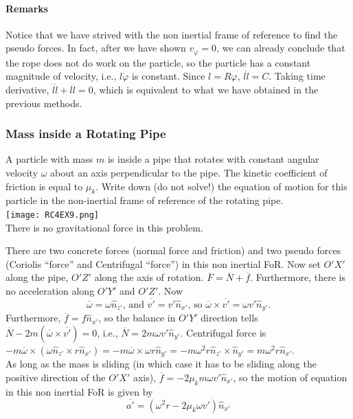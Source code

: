 \documentclass[a4paper,12pt,titlepage]{article}
\begin{document}
\paragraph{Remarks}
Notice that we have strived with the non inertial frame of reference to find the pseudo forces. In fact, after we have shown $v_{\varphi}=0$, we can already conclude that the rope does not do work on the particle, so the particle has a constant magnitude of velocity, i.e., $l\dot\varphi$ is constant. Since $l=R\varphi$, $l\dot l=C$. Taking time derivative, $\dot l \dot l+l\ddot l=0$, which is equivalent to what we have obtained in the previous methods.
\subsubsection{Mass inside a Rotating Pipe}
A particle with mass $m$ is inside a pipe that rotates with constant angular velocity $\omega$ about an axis perpendicular to the pipe. The kinetic coefficient of friction is equal to $\mu_k$. Write down (do not solve!) the equation of motion for this particle in the non-inertial frame of reference of the rotating pipe.\\\texttt{[image: RC4EX9.png]}\\
There is no gravitational force in this problem.

There are two concrete forces (normal force and friction) and two pseudo forces (Coriolis ``force'' and Centrifugal ``force'') in this non inertial FoR. Now set $O'X'$ along the pipe, $O'Z'$ along the axis of rotation. $\overline{F}=\overline{N}+\overline{f}$. Furthermore, there is no acceleration along $O'Y'$ and $O'Z'$. Now \[\overline{\omega}=\omega\hat{n}_{z'}\text{, and }\overline{v'}=v'\hat{n}_{x'}\text{, so }\overline{\omega}\times\overline{v'}=\omega v'\hat{n}_{y'}.\] Furthermore, $\overline{f}=f\hat{n}_{x'}$, so the balance in $O'Y'$ direction tells $\overline{N}-2m(\overline{\omega}\times\overline{v'})=0$, i.e., $\overline{N}=2m\omega v'\hat{n}_{y'}$. Centrifugal force is $-m\overline{\omega}\times(\omega\hat{n}_{z'}\times r\hat{n}_{x'})=-m\overline{\omega}\times\omega r\hat{n}_{y'}=-m\omega^2 r\hat{n}_{z'}\times\hat{n}_{y'}=m\omega^2 r\hat{n}_{x'}$.\\As long as the mass is sliding (in which case it has to be sliding along the positive direction of the $O'X'$ axis), $\overline{f}=-2\mu_k m\omega v'\hat{n}_{x'}$, so the motion of equation in this non inertial FoR is given by
\[\overline{a'}=(\omega^2 r-2\mu_k \omega v')\hat{n}_{x'}\]
\end{document}
